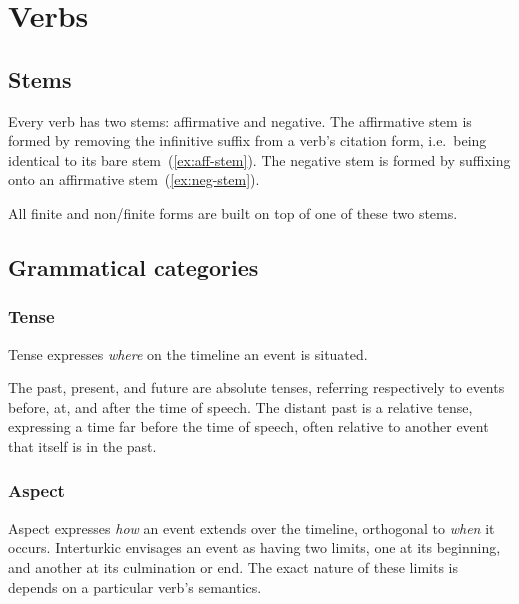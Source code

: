 \chapter{Verbs}

\section{Stems}

Every verb has two stems: affirmative and negative.
The affirmative stem is formed by removing the infinitive suffix from a verb's
citation form, i.e.\ being identical to its bare stem~(\vref{ex:aff-stem}).
The negative stem is formed by suffixing 
onto an affirmative stem~(\vref{ex:neg-stem}).

\pex
  \a\label{ex:aff-stem}%
  \a\label{ex:neg-stem}%
\xe

All finite and non\-/finite forms are built on top of one of these two stems.

\section{Grammatical categories}

\subsection{Tense}

Tense expresses \emph{where} on the timeline an event is situated.

The past, present, and future are absolute tenses, referring respectively to
events before, at, and after the time of speech.
The distant past is a relative tense, expressing a time far before the time of
speech, often relative to another event that itself is in the past.

\subsection{Aspect}

Aspect expresses \emph{how} an event extends over the timeline, orthogonal to
\emph{when} it occurs.
Interturkic envisages an event as having two limits, one at its beginning, and
another at its culmination or end.
The exact nature of these limits is depends on a particular verb's semantics.

